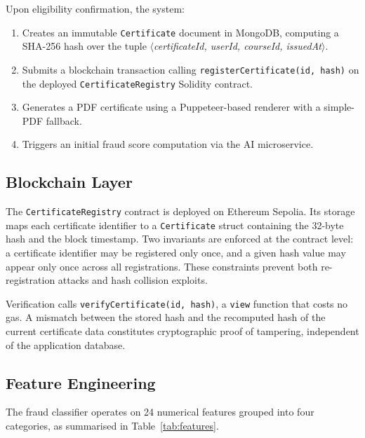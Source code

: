 \documentclass[conference]{IEEEtran}
\begin{document}
Upon eligibility confirmation, the system:
\begin{enumerate}
    \item Creates an immutable \texttt{Certificate} document in
    MongoDB, computing a SHA-256 hash over the tuple
    $\langle$\textit{certificateId, userId, courseId, issuedAt}$\rangle$.
    \item Submits a blockchain transaction calling
    \texttt{registerCertificate(id, hash)} on the deployed
    \texttt{CertificateRegistry} Solidity contract.
    \item Generates a PDF certificate using a Puppeteer-based
    renderer with a simple-PDF fallback.
    \item Triggers an initial fraud score computation via the AI
    microservice.
\end{enumerate}

\subsection{Blockchain Layer}

The \texttt{CertificateRegistry} contract is deployed on Ethereum
Sepolia. Its storage maps each certificate identifier to a
\texttt{Certificate} struct containing the 32-byte hash and the
block timestamp. Two invariants are enforced at the contract level:
a certificate identifier may be registered only once, and a given
hash value may appear only once across all registrations. These
constraints prevent both re-registration attacks and hash collision
exploits.

Verification calls \texttt{verifyCertificate(id, hash)}, a
\texttt{view} function that costs no gas. A mismatch between the
stored hash and the recomputed hash of the current certificate data
constitutes cryptographic proof of tampering, independent of the
application database.

\subsection{Feature Engineering}

The fraud classifier operates on 24 numerical features grouped into
four categories, as summarised in Table~\ref{tab:features}.
\end{document}
